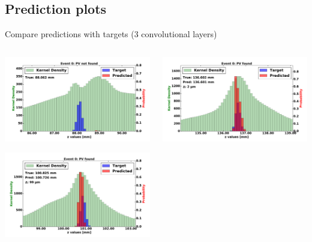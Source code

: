 \subsection{Prediction plots}

\begin{frame}{Compare predictions with targets (3 convolutional layers)}
  \begin{columns}[c]
        \begin{center}
            \includegraphics[width=1\textwidth,height=0.45\textwidth, trim=18 0 18 0]{images/120000_3layer_00.pdf}
    
            \includegraphics[width=1\textwidth, height=0.45\textwidth,trim=18 0 18 0]{images/120000_3layer_01.pdf}

        \end{center}
        \begin{center}
           \includegraphics[width=1\textwidth, height=0.45\textwidth, trim=18 0 18 0]{images/120000_3layer_02.pdf}
    

\end{center}
\end{columns}
\end{frame}
